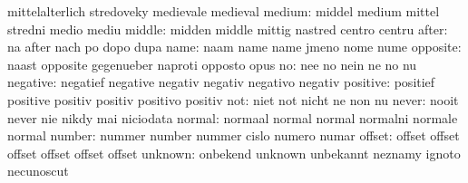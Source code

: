                            mittelalterlich           stredoveky
                           medievale                 medieval
                   medium: middel                    medium
                           mittel                    stredni
                           medio                     mediu
                   middle: midden                    middle
                           mittig                    nastred
                           centro                    centru
                    after: na                        after
                           nach                      po
                           dopo                      dupa
                     name: naam                      name
                           name                      jmeno
                           nome                      nume
                 opposite: naast                     opposite
                           gegenueber                naproti
                           opposto                   opus
                       no: nee                       no
                           nein                      ne
                           no                        nu
                 negative: negatief                  negative
                           negativ                   negativ
                           negativo                  negativ
                 positive: positief                  positive
                           positiv                   positiv
                           positivo                  positiv
                      not: niet                      not
                           nicht                     ne
                           non                       nu
                    never: nooit                     never
                           nie                       nikdy
                           mai                       niciodata
                   normal: normaal                   normal
                           normal                    normalni
                           normale                   normal
                   number: nummer                    number
                           nummer                    cislo
                           numero                    numar
                   offset: offset                    offset
                           offset                    offset
                           offset                    offset
                  unknown: onbekend                  unknown
                           unbekannt                 neznamy
                           ignoto                    necunoscut
